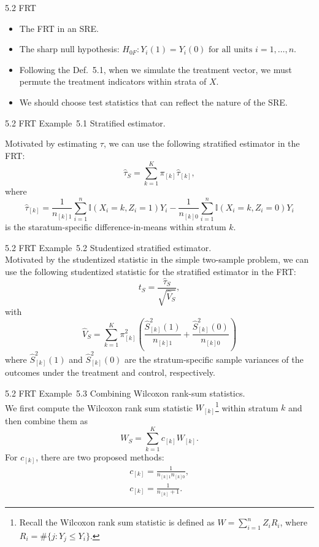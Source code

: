 \documentclass[aspectratio=169, 12pt]{beamer}
\begin{document}
\begin{frame}{5.2 FRT}
  \begin{itemize}
    \item The FRT in an SRE.
    \item The sharp null hypothesis: $H_{0F}:Y_i(1)=Y_i(0)\text{ for all units }i=1,\dots,n.$
    \item Following the Def.~5.1, when we simulate the treatment vector, we must permute the treatment indicators within strata of $X$.
    \item We should choose test statistics that can reflect the nature of the SRE.
  \end{itemize}
\end{frame}

\begin{frame}{5.2 FRT}
  Example~5.1 Stratified estimator.\\
  {

    Motivated by estimating $\tau$, we can use the following stratified estimator in the FRT:
    \[
    \widehat{\tau}_S=\sum_{k=1}^{K}\pi_{[k]}\widehat{\tau}_{[k]},
    \]
    where
    \[
    \widehat{\tau}_{[k]} = \frac{1}{n_{[k]1}}\sum_{i=1}^{n}\mathbb{I}(X_i=k,Z_i=1)Y_i - \frac{1}{n_{[k]0}}\sum_{i=1}^{n}\mathbb{I}(X_i=k,Z_i=0)Y_i
    \]
    is the staratum-specific difference-in-means within stratum $k$.
  }
\end{frame}

\begin{frame}{5.2 FRT}
  Example~5.2 Studentized stratified estimator.\\

  Motivated by the studentized statistic in the simple two-sample problem, we can use the following studentized statistic for the stratified estimator in the FRT:
  \[
  t_S = \frac{\widehat{\tau}_S}{\sqrt{\widehat{V}_S}},
  \]
  with
  \[
  \widehat{V}_S=\sum_{k=1}^{K}\pi_{[k]}^2\left(\frac{\widehat{S}_{[k]}^2(1)}{n_{[k]1}}+\frac{\widehat{S}_{[k]}^2(0)}{n_{[k]0}}\right)
  \]
  where $\widehat{S}_{[k]}^2(1)$ and $\widehat{S}_{[k]}^2(0)$ are the stratum-specific sample variances of the outcomes under the treatment and control, respectively.
\end{frame}

\begin{frame}{5.2 FRT}
  Example~5.3 Combining Wilcoxon rank-sum statistics.\\
  We first compute the Wilcoxon rank sum statistic $W_{[k]}$\footnote{\scriptsize Recall the Wilcoxon rank sum statistic is defined as $W=\sum_{i=1}^{n}Z_iR_i$, where $R_i=\#\{j:Y_j\leq Y_i\}$.} within stratum $k$ and then combine them as 
  \[
  W_S = \sum_{k=1}^{K}c_{[k]}W_{[k]}.
  \]
  For $c_{[k]}$, there are two proposed methods:
  \begin{gather*}
    c_{[k]}=\frac{1}{n_{[k]1}n_{[k]0}},\\
    c_{[k]}=\frac{1}{n_{[k]}+1}.
  \end{gather*}
\end{frame}
\end{document}
